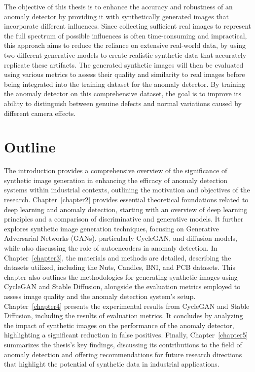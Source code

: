 \documentclass[12pt,DIV14,BCOR12mm,a4paper,footinclude=false,headinclude,parskip=half-,twoside,openright,cleardoublepage=empty,toc=index,bibliography=totoc,listof=totoc]{scrreprt}
\numberwithin{equation}{chapter}
\begin{document}
The objective of this thesis is to enhance the accuracy and robustness of an anomaly detector by providing it with synthetically generated images that incorporate different influences. Since collecting sufficient real images to represent the full spectrum of possible influences is often time-consuming and impractical, this approach aims to reduce the reliance on extensive real-world data, by using two different generative models to create realistic synthetic data that accurately replicate these artifacts. The generated synthetic images will then be evaluated using various metrics to assess their quality and similarity to real images before being integrated into the training dataset for the anomaly detector. By training the anomaly detector on this comprehensive dataset, the goal is to improve its ability to distinguish between genuine defects and normal variations caused by different camera effects.

\section{Outline}

The introduction provides a comprehensive overview of the significance of synthetic image generation in enhancing the efficacy of anomaly detection systems within industrial contexts, outlining the motivation and objectives of the research. Chapter~\ref{chapter2} provides essential theoretical foundations related to deep learning and anomaly detection, starting with an overview of deep learning principles and a comparison of discriminative and generative models. It further explores synthetic image generation techniques, focusing on Generative Adversarial Networks (GANs), particularly CycleGAN, and diffusion models, while also discussing the role of autoencoders in anomaly detection. In Chapter~\ref{chapter3}, the materials and methods are detailed, describing the datasets utilized, including the Nuts, Candles, BNI, and PCB datasets. This chapter also outlines the methodologies for generating synthetic images using CycleGAN and Stable Diffusion, alongside the evaluation metrics employed to assess image quality and the anomaly detection system's setup. Chapter~\ref{chapter4} presents the experimental results from CycleGAN and Stable Diffusion, including the results of evaluation metrics. It concludes by analyzing the impact of synthetic images on the performance of the anomaly detector, highlighting a significant reduction in false positives. Finally, Chapter~\ref{chapter5} summarizes the thesis's key findings, discussing its contributions to the field of anomaly detection and offering recommendations for future research directions that highlight the potential of synthetic data in industrial applications.
\end{document}
